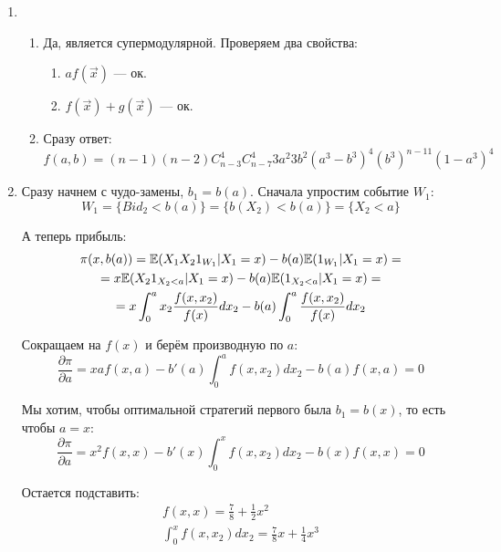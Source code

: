 \begin{enumerate}

\item
\begin{enumerate}
\item Да, является супермодулярной. Проверяем два свойства:
\begin{enumerate}
\item $ af(\vec{x}) $ — ок.
\item $ f(\vec{x})+g(\vec{x}) $ — ок.
\end{enumerate}

\item Сразу ответ: $ f(a,b)=(n-1)(n-2)C_{n-3}^{4}C_{n-7}^{4}3a^{2}3b^{2}(a^{3}-b^{3})^{4}(b^{3})^{n-11}(1-a^{3})^{4} $
\end{enumerate}


\item Сразу начнем с чудо-замены, $ b_{1}=b(a) $. Сначала упростим событие $ W_{1} $:
\begin{equation}
W_{1}=\{Bid_{2}<b(a)\}=\{b(X_{2})<b(a)\}=\{X_{2}<a\}
\end{equation}

А теперь прибыль:
\begin{multline}
\pi(x,b(a))=\mathbb{E}(X_{1}X_{2}1_{W_{1}}|X_{1}=x)-b(a)\mathbb{E}(1_{W_{1}}|X_{1}=x)=\\
=x\mathbb{E}(X_{2}1_{X_{2}<a}|X_{1}=x)-b(a)\mathbb{E}(1_{X_{2}<a}|X_{1}=x)=\\
=x\int_{0}^{a}x_{2}\frac{f(x,x_{2})}{f(x)}dx_{2}-b(a)\int_{0}^{a}\frac{f(x,x_{2})}{f(x)}dx_{2}
\end{multline}


Сокращаем на $ f(x) $ и берём производную по $ a $:
\begin{equation}
\frac{\partial \pi}{\partial a}=xaf(x,a)-b'(a)\int_{0}^{a}f(x,x_{2})dx_{2}-b(a)f(x,a)=0
\end{equation}


Мы хотим, чтобы оптимальной стратегий первого была $ b_{1}=b(x) $, то есть чтобы $ a=x $:
\begin{equation}
\frac{\partial \pi}{\partial a}=x^{2}f(x,x)-b'(x)\int_{0}^{x}f(x,x_{2})dx_{2}-b(x)f(x,x)=0
\end{equation}

Остается подставить:
\begin{equation}
\begin{array}{c}
f(x,x)=\frac{7}{8}+\frac{1}{2}x^{2} \\
\int_{0}^{x}f(x,x_{2})dx_{2}=\frac{7}{8}x+\frac{1}{4}x^{3}
\end{array}
\end{equation}



\end{enumerate}
